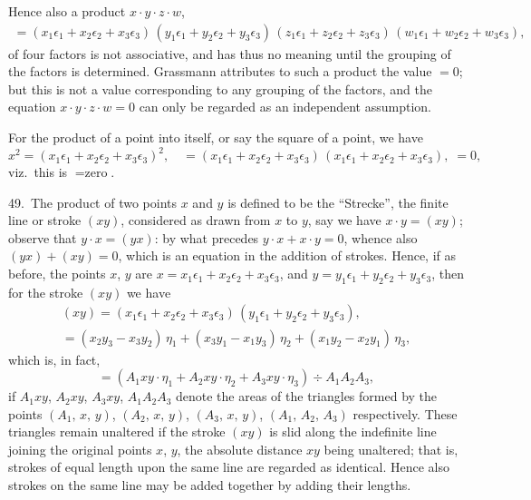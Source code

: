 \documentclass[11pt,a4paper]{book}
\begin{document}
Hence also a product $x \cdot y \cdot z \cdot w$,
\begin{multline*}
= (x_1 \epsilon_1 + x_2 \epsilon_2 + x_3 \epsilon_3)\,
(y_1 \epsilon_1 + y_2 \epsilon_2 + y_3 \epsilon_3)\,
(z_1 \epsilon_1 + z_2 \epsilon_2 + z_3 \epsilon_3)\,
(w_1 \epsilon_1 + w_2 \epsilon_2 + w_3 \epsilon_3),
\end{multline*}
of four factors is not associative, and has thus no meaning until the grouping of
the factors is determined. Grassmann attributes to such a product the value $= 0$;
but this is not a value corresponding to any grouping of the factors, and the equation
$x \cdot y \cdot z \cdot w = 0$ can only be regarded as an independent assumption.

For the product of a point into itself, or say the square of a point, we have
\[
x^2 = (x_1 \epsilon_1 + x_2 \epsilon_2 + x_3 \epsilon_3)^2, \quad
= (x_1 \epsilon_1 + x_2 \epsilon_2 + x_3 \epsilon_3)\,
(x_1 \epsilon_1 + x_2 \epsilon_2 + x_3 \epsilon_3), \;= 0,
\]
viz.\ this is $= \text{zero}$.

49.\ The product of two points $x$ and $y$ is defined to be the ``Strecke'', the finite
line or stroke $(xy)$, considered as drawn from $x$ to $y$, say we have $x \cdot y = (xy)$;
observe that $y \cdot x = (yx)$: by what precedes $y \cdot x + x \cdot y = 0$, whence
also $(yx) + (xy) = 0$, which is an equation in the addition of strokes.
Hence, if as before, the points $x$, $y$ are
$x = x_1 \epsilon_1 + x_2 \epsilon_2 + x_3 \epsilon_3$, and
$y = y_1 \epsilon_1 + y_2 \epsilon_2 + y_3 \epsilon_3$, then for the stroke $(xy)$ we have
\begin{multline*}
(xy) = (x_1 \epsilon_1 + x_2 \epsilon_2 + x_3 \epsilon_3)\, (y_1 \epsilon_1 + y_2 \epsilon_2 + y_3 \epsilon_3),\\
= (x_2 y_3 - x_3 y_2)\, \eta_1 + (x_3 y_1 - x_1 y_3)\, \eta_2 + (x_1 y_2 - x_2 y_1)\, \eta_3,
\end{multline*}
which is, in fact,
\[
= (A_1 xy \cdot \eta_1 + A_2 xy \cdot \eta_2 + A_3 xy \cdot \eta_3) \div A_1 A_2 A_3,
\]
if $A_1 xy$, $A_2 xy$, $A_3 xy$, $A_1 A_2 A_3$ denote the areas of the triangles formed by the points
$(A_1,\, x,\, y)$, $(A_2,\, x,\, y)$, $(A_3,\, x,\, y)$, $(A_1,\, A_2,\, A_3)$ respectively.
These triangles remain unaltered if the stroke $(xy)$ is slid along the indefinite line joining
the original points $x$, $y$, the absolute distance $xy$ being unaltered; that is, strokes of equal
length upon the same line are regarded as identical. Hence also strokes on the same line may
be added together by adding their lengths.
\end{document}
